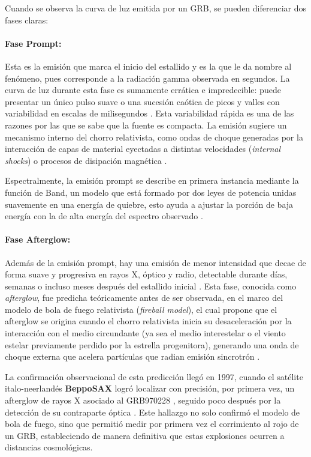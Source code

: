 Cuando se observa la curva de luz emitida por un GRB, se pueden diferenciar dos fases claras: 

\paragraph{Fase Prompt:}
Esta es la emisión que marca el inicio del estallido y es la que le da nombre al fenómeno, pues corresponde a la radiación gamma observada en segundos. La curva de luz durante esta fase es sumamente errática e impredecible: puede presentar un único pulso suave o una sucesión caótica de picos y valles con variabilidad en escalas de milisegundos \cite{Piran2000}. Esta variabilidad rápida es una de las razones por las que se sabe que la fuente es compacta. La emisión sugiere un mecanismo interno del chorro relativista, como ondas de choque generadas por la interacción de capas de material eyectadas a distintas velocidades (\textit{internal shocks}) o procesos de disipación magnética \cite{Meszaros2006, Zhang2004}.

Espectralmente, la emisión prompt se describe en primera instancia mediante la función de Band, un modelo que está formado por dos leyes de potencia unidas suavemente en una energía de quiebre, esto ayuda a ajustar la porción de baja energía con la de alta energía del espectro observado \cite{Band1993}.

\paragraph{Fase Afterglow:}
Además de la emisión prompt, hay una emisión de menor intensidad que decae de forma suave y progresiva en rayos X, óptico y radio, detectable durante días, semanas o incluso meses después del estallido inicial \cite{MeszarosRees1997}. Esta fase, conocida como \textit{afterglow}, fue predicha teóricamente antes de ser observada, en el marco del modelo de bola de fuego relativista (\textit{fireball model}), el cual propone que el afterglow se origina cuando el chorro relativista inicia su desaceleración por la interacción con el medio circundante (ya sea el medio interestelar o el viento estelar previamente perdido por la estrella progenitora), generando una onda de choque externa que acelera partículas que radian emisión sincrotrón \cite{MeszarosRees1997}.

La confirmación observacional de esta predicción llegó en 1997, cuando el satélite italo-neerlandés \textbf{BeppoSAX} logró localizar con precisión, por primera vez, un afterglow de rayos X asociado al GRB970228 \cite{Costa1997}, seguido poco después por la detección de su contraparte óptica \cite{vanParadijs1997}. Este hallazgo no solo confirmó el modelo de bola de fuego, sino que permitió medir por primera vez el corrimiento al rojo de un GRB, estableciendo de manera definitiva que estas explosiones ocurren a distancias cosmológicas.

